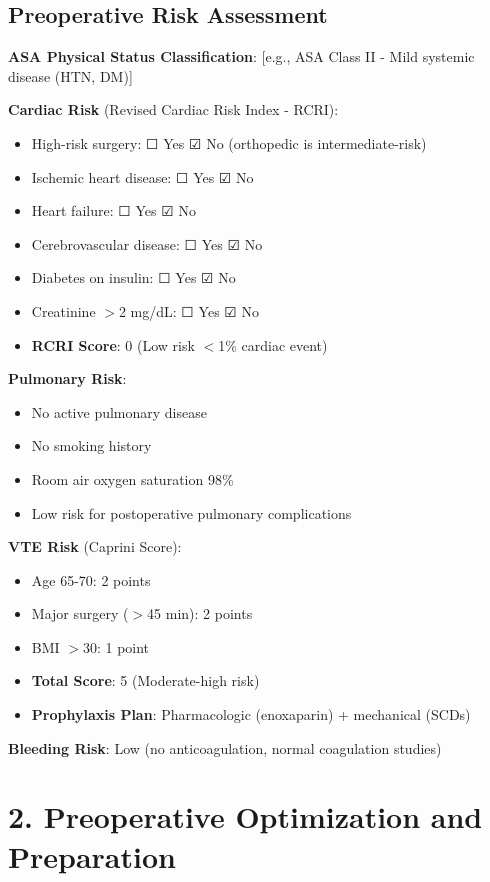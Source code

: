 \documentclass[11pt,letterpaper]{article}
\begin{document}
\subsection*{Preoperative Risk Assessment}

\textbf{ASA Physical Status Classification}: [e.g., ASA Class II - Mild systemic disease (HTN, DM)]

\textbf{Cardiac Risk} (Revised Cardiac Risk Index - RCRI):
\begin{itemize}[leftmargin=*]
    \item High-risk surgery: ☐ Yes ☑ No (orthopedic is intermediate-risk)
    \item Ischemic heart disease: ☐ Yes ☑ No
    \item Heart failure: ☐ Yes ☑ No
    \item Cerebrovascular disease: ☐ Yes ☑ No
    \item Diabetes on insulin: ☐ Yes ☑ No
    \item Creatinine $>$2 mg/dL: ☐ Yes ☑ No
    \item \textbf{RCRI Score}: 0 (Low risk $<$1\% cardiac event)
\end{itemize}

\textbf{Pulmonary Risk}:
\begin{itemize}[leftmargin=*]
    \item No active pulmonary disease
    \item No smoking history
    \item Room air oxygen saturation 98\%
    \item Low risk for postoperative pulmonary complications
\end{itemize}

\textbf{VTE Risk} (Caprini Score):
\begin{itemize}[leftmargin=*]
    \item Age 65-70: 2 points
    \item Major surgery ($>$45 min): 2 points
    \item BMI $>$30: 1 point
    \item \textbf{Total Score}: 5 (Moderate-high risk)
    \item \textbf{Prophylaxis Plan}: Pharmacologic (enoxaparin) + mechanical (SCDs)
\end{itemize}

\textbf{Bleeding Risk}: Low (no anticoagulation, normal coagulation studies)

\section*{2. Preoperative Optimization and Preparation}
\end{document}
